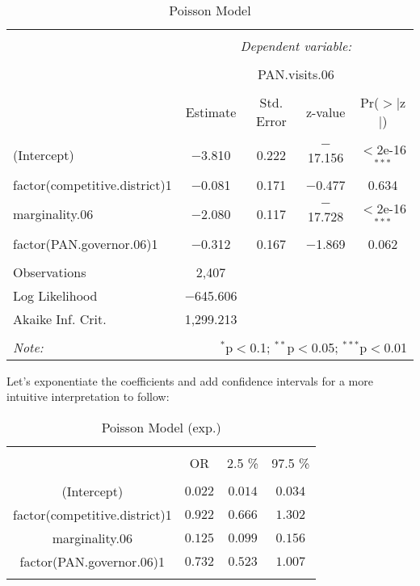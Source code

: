 \documentclass[12pt,letterpaper]{article}
\begin{document}
\begin{enumerate}
\begin{table}[!htbp] \centering 
  \caption{Poisson Model} 
  \label{} 
\begin{tabular}{@{\extracolsep{5pt}}lcccc} 
\\[-1.8ex]\hline 
\hline \\[-1.8ex] 
 & \multicolumn{4}{c}{\textit{Dependent variable:}} \\ 
\cline{2-5} 
\\[-1.8ex] & \multicolumn{4}{c}{PAN.visits.06} \\ 
\\[-1.8ex] & Estimate & Std. Error & z-value & Pr($>$$|$z$|$) \\ 
\hline \\[-1.8ex] 
 (Intercept) & $-$3.810 & 0.222 & $-$17.156 & $<$2e-16$^{***}$ \\ 
  factor(competitive.district)1 & $-$0.081 & 0.171 & $-$0.477 & 0.634 \\ 
  marginality.06 & $-$2.080 & 0.117 & $-$17.728 & $<$2e-16$^{***}$ \\ 
  factor(PAN.governor.06)1 & $-$0.312 & 0.167 & $-$1.869 & 0.062 \\ 
\hline \\[-1.8ex] 
Observations & 2,407 & & & \\ 
Log Likelihood & $-$645.606 & & & \\ 
Akaike Inf. Crit. & 1,299.213 & & & \\ 
\hline 
\hline \\[-1.8ex] 
\textit{Note:}  & \multicolumn{4}{r}{$^{*}$p$<$0.1; $^{**}$p$<$0.05; $^{***}$p$<$0.01} \\ 
\end{tabular} 
\end{table}
	
		Let's exponentiate the coefficients and add confidence intervals for a more intuitive interpretation to follow: 
	
	 

\begin{table}[H] \centering   \caption{Poisson Model (exp.)}   \label{} \begin{tabular}{@{\extracolsep{5pt}} cccc} \\[-1.8ex]\hline \hline \\[-1.8ex]  & OR & 2.5 \% & 97.5 \% \\ \hline \\[-1.8ex] (Intercept) & $0.022$ & $0.014$ & $0.034$ \\ factor(competitive.district)1 & $0.922$ & $0.666$ & $1.302$ \\ marginality.06 & $0.125$ & $0.099$ & $0.156$ \\ factor(PAN.governor.06)1 & $0.732$ & $0.523$ & $1.007$ \\ \hline \\[-1.8ex] \end{tabular} \end{table} 



\end{enumerate}
\end{document}
